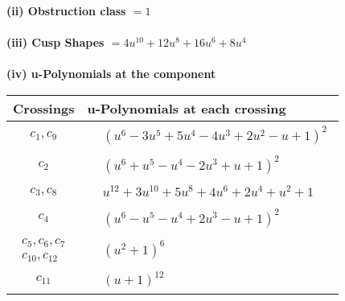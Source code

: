 \documentclass[1p]{elsarticle_modified}
\theoremstyle{definition}
\begin{document}
\flushleft \textbf{(ii) Obstruction class $= 1$}\\~\\
\flushleft \textbf{(iii) Cusp Shapes $= 4 u^{10}+12 u^8+16 u^6+8 u^4$}\\~\\
\newpage\renewcommand{\arraystretch}{1}
\flushleft \textbf{(iv) u-Polynomials at the component}\newline \\
\begin{tabular}{m{50pt}|m{274pt}}
Crossings & \hspace{64pt}u-Polynomials at each crossing \\
\hline $$\begin{aligned}c_{1},c_{9}\end{aligned}$$&$\begin{aligned}
&(u^6-3 u^5+5 u^4-4 u^3+2 u^2- u+1)^2
\end{aligned}$\\
\hline $$\begin{aligned}c_{2}\end{aligned}$$&$\begin{aligned}
&(u^6+u^5- u^4-2 u^3+u+1)^2
\end{aligned}$\\
\hline $$\begin{aligned}c_{3},c_{8}\end{aligned}$$&$\begin{aligned}
&u^{12}+3 u^{10}+5 u^8+4 u^6+2 u^4+u^2+1
\end{aligned}$\\
\hline $$\begin{aligned}c_{4}\end{aligned}$$&$\begin{aligned}
&(u^6- u^5- u^4+2 u^3- u+1)^2
\end{aligned}$\\
\hline $$\begin{aligned}c_{5},c_{6},c_{7}\\c_{10},c_{12}\end{aligned}$$&$\begin{aligned}
&(u^2+1)^6
\end{aligned}$\\
\hline $$\begin{aligned}c_{11}\end{aligned}$$&$\begin{aligned}
&(u+1)^{12}
\end{aligned}$\\
\hline
\end{tabular}\\~\\
\end{document}
